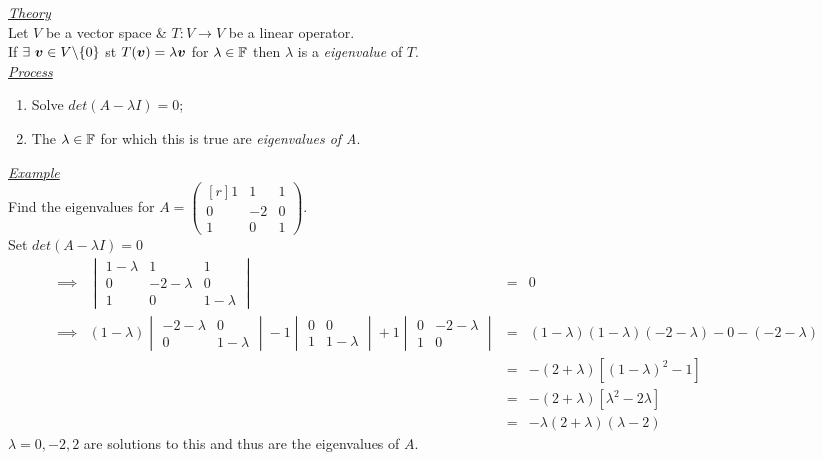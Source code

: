 \documentclass[11pt,a4paper]{article}
\begin{document}
\underline{\textit{Theory}}\\
Let $V$ be a vector space \& $T : V \to V$ be a linear operator.\\
If $\exists\ \boldsymbol{v} \in V\backslash\{0\}$ st $T(\boldsymbol{v}) = \lambda\boldsymbol{v}$ for $\lambda \in \mathbb{F}$ then $\lambda$ is a \textit{eigenvalue} of $T$.\\

\underline{\textit{Process}}
\begin{enumerate}[label=\roman*)]\itemsep0em
  \item Solve $det(A - \lambda I) = 0$;
  \item The $\lambda \in \mathbb{F}$ for which this is true are \textit{eigenvalues of A}.
\end{enumerate}

\underline{\textit{Example}}\\
Find the eigenvalues for $A = \begin{pmatrix*}[r] 1 & 1 & 1 \\ 0 & -2 & 0 \\ 1 & 0 & 1 \end{pmatrix*}$.\\
Set $det(A - \lambda I) = 0$
\[\begin{array}{crcl}
  \implies& \begin{vmatrix} 1-\lambda & 1 & 1 \\ 0 & -2 -\lambda & 0 \\ 1 & 0 & 1-\lambda \end{vmatrix} &=& 0\\
  \implies& (1-\lambda)\begin{vmatrix}-2-\lambda & 0 \\ 0 & 1 - \lambda \end{vmatrix} - 1\begin{vmatrix}0 & 0 \\1 & 1-\lambda \end{vmatrix} + 1\begin{vmatrix} 0 & -2-\lambda \\ 1 & 0\end{vmatrix} &=& (1-\lambda)(1-\lambda)(-2-\lambda) - 0 -(-2-\lambda)\\
  & &=& -(2+\lambda)\left[(1-\lambda)^2 - 1\right]\\
  & &=& -(2+\lambda)\left[\lambda^2 - 2\lambda\right]\\
  & &=& -\lambda(2+\lambda)(\lambda-2)
\end{array}\]
$\lambda = 0, -2, 2$ are solutions to this and thus are the eigenvalues of $A$.\\
\end{document}
